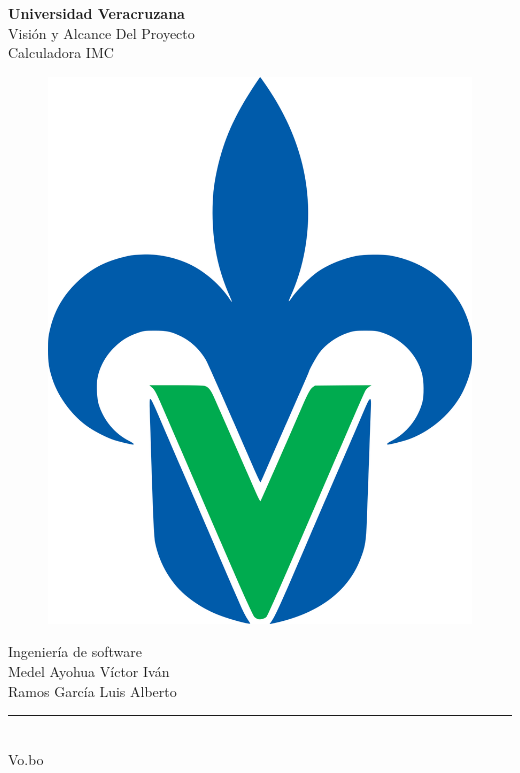 \begin{titlepage}
	\begin{center}
	{\huge \textbf{Universidad Veracruzana}}\\
	\vspace{2cm}  
	{\Large {Visión y Alcance Del Proyecto}}\\
	\vspace{5mm}	
	{\Large {Calculadora IMC}}\\
	\begin{figure}[h]
		\centering
		\includegraphics[scale=0.10]{uvlogo}
	\end{figure}
	{\Large {Ingeniería de software}}\\
    \vspace{2cm}
	{\Large {Medel Ayohua Víctor Iván}}\\
	\vspace{3mm}	
	{\Large {Ramos García Luis Alberto}}\\
	\vspace{2cm}	
    \rule{8cm}{0.5mm} \\ \Large Vo.bo\\ 
	\end{center}
\end{titlepage}
